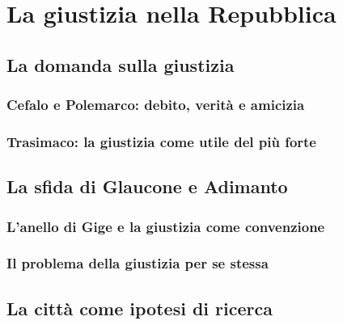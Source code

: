 \chapter{La giustizia nella Repubblica}
\label{cap:platone:giustizia}

\section{La domanda sulla giustizia}

\subsection{Cefalo e Polemarco: debito, verità e amicizia}

\subsection{Trasimaco: la giustizia come utile del più forte}

\section{La sfida di Glaucone e Adimanto}

\subsection{L'anello di Gige e la giustizia come convenzione}

\subsection{Il problema della giustizia per se stessa}

\section{La città come ipotesi di ricerca}

